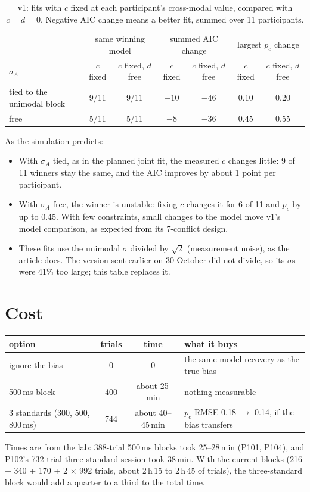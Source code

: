 \documentclass[11pt,a4paper]{article}
\newcommand{\pc}{p_c}
\begin{document}
\begin{table}[H]\centering\small
\begin{tabular}{lcccccc}
\toprule
 & \multicolumn{2}{c}{same winning model} & \multicolumn{2}{c}{summed AIC change} & \multicolumn{2}{c}{largest $\pc$ change} \\
$\sigma_A$ & $c$ fixed & $c$ fixed, $d$ free & $c$ fixed & $c$ fixed, $d$ free & $c$ fixed & $c$ fixed, $d$ free \\
\midrule
tied to the unimodal block & 9/11 & 9/11 & $-10$ & $-46$ & 0.10 & 0.20 \\
free & 5/11 & 5/11 & $-8$ & $-36$ & 0.45 & 0.55 \\
\bottomrule
\end{tabular}
\caption{v1: fits with $c$ fixed at each participant's cross-modal value, compared with $c = d = 0$. Negative AIC change means a better fit, summed over 11 participants.}
\end{table}

As the simulation predicts:
\begin{itemize}
\item With $\sigma_A$ tied, as in the planned joint fit, the measured $c$ changes little: 9 of 11 winners stay the same, and the AIC improves by about 1 point per participant.
\item With $\sigma_A$ free, the winner is unstable: fixing $c$ changes it for 6 of 11 and $\pc$ by up to 0.45. With few constraints, small changes to the model move v1's model comparison, as expected from its 7-conflict design.
\item These fits use the unimodal $\sigma$ divided by $\sqrt 2$ (measurement noise), as the article does. The version sent earlier on 30 October did not divide, so its $\sigma$s were 41\% too large; this table replaces it.
\end{itemize}

\section{Cost}
\begin{center}\small
\begin{tabular}{lccl}
\toprule
option & trials & time & what it buys \\
\midrule
ignore the bias & 0 & 0 & the same model recovery as the true bias \\
500\,ms block & 400 & about 25\,min & nothing measurable \\
3 standards (300, 500, 800\,ms) & 744 & about 40--45\,min & $\pc$ RMSE 0.18 $\to$ 0.14, if the bias transfers \\
\bottomrule
\end{tabular}
\end{center}
Times are from the lab: 388-trial 500\,ms blocks took 25--28\,min (P101, P104), and P102's 732-trial three-standard session took 38\,min. With the current blocks (216 + 340 + 170 + 2 $\times$ 992 trials, about 2\,h\,15 to 2\,h\,45 of trials), the three-standard block would add a quarter to a third to the total time.
\end{document}
